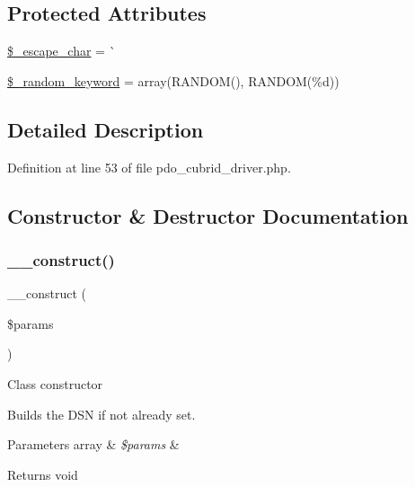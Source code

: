 \subsection*{Protected Attributes}
\begin{DoxyCompactItemize}
\item 
\mbox{\hyperlink{class_c_i___d_b__pdo__cubrid__driver_aaec2fb0112850159063a8e47ad3aed6e}{\$\+\_\+escape\+\_\+char}} = \textquotesingle{}\`{}\textquotesingle{}
\item 
\mbox{\hyperlink{class_c_i___d_b__pdo__cubrid__driver_a10213aa6e05f6d924d3277bb1d2fea00}{\$\+\_\+random\+\_\+keyword}} = array(\textquotesingle{}R\+A\+N\+D\+OM()\textquotesingle{}, \textquotesingle{}R\+A\+N\+D\+OM(\%d)\textquotesingle{})
\end{DoxyCompactItemize}


\subsection{Detailed Description}


Definition at line 53 of file pdo\+\_\+cubrid\+\_\+driver.\+php.



\subsection{Constructor \& Destructor Documentation}
\mbox{\label{class_c_i___d_b__pdo__cubrid__driver_a9162320adff1a1a4afd7f2372f753a3e}} 
\subsubsection{\texorpdfstring{\_\_construct()}{\_\_construct()}}
{\footnotesize\ttfamily \+\_\+\+\_\+construct (\begin{DoxyParamCaption}\item[{}]{\$params }\end{DoxyParamCaption})}

Class constructor

Builds the D\+SN if not already set.


\begin{DoxyParams}[1]{Parameters}
array & {\em \$params} & \\
\hline
\end{DoxyParams}
\begin{DoxyReturn}{Returns}
void 
\end{DoxyReturn}



